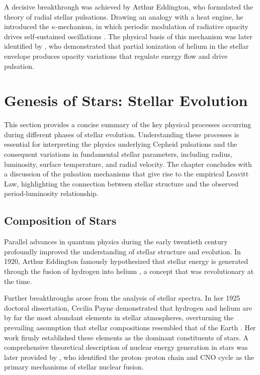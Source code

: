 A decisive breakthrough was achieved by Arthur Eddington, who formulated the theory of radial stellar pulsations. Drawing an analogy with a heat engine, he introduced the $\kappa$-mechanism, in which periodic modulation of radiative opacity drives self-sustained oscillations \citep{1917eddington}. The physical basis of this mechanism was later identified by \cite{1963zhevakin}, who demonstrated that partial ionization of helium in the stellar envelope produces opacity variations that regulate energy flow and drive pulsation.


\section{Genesis of Stars: Stellar Evolution}

This section provides a concise summary of the key physical processes occurring during different phases of stellar evolution. Understanding these processes is essential for interpreting the physics underlying Cepheid pulsations and the consequent variations in fundamental stellar parameters, including radius, luminosity, surface temperature, and radial velocity. The chapter concludes with a discussion of the pulsation mechanisms that give rise to the empirical Leavitt Law, highlighting the connection between stellar structure and the observed period-luminosity relationship.

\subsection{Composition of Stars}

Parallel advances in quantum physics during the early twentieth century profoundly improved the understanding of stellar structure and evolution. In 1920, Arthur Eddington famously hypothesized that stellar energy is generated through the fusion of hydrogen into helium \citep{1920eddington}, a concept that was revolutionary at the time.


 

Further breakthroughs arose from the analysis of stellar spectra. In her 1925 doctoral dissertation, Cecilia Payne demonstrated that hydrogen and helium are by far the most abundant elements in stellar atmospheres, overturning the prevailing assumption that stellar compositions resembled that of the Earth \citep{1925payne}. Her work firmly established these elements as the dominant constituents of stars. A comprehensive theoretical description of nuclear energy generation in stars was later provided by \cite{1939bethe}, who identified the proton--proton chain and CNO cycle as the primary mechanisms of stellar nuclear fusion.

